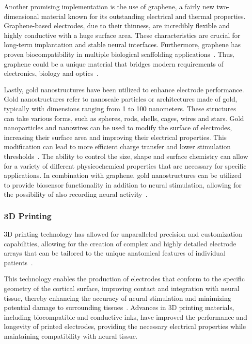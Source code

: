 \documentclass[twocolumn,10pt]{article}
\begin{document}
Another promising implementation is the use of graphene, a fairly new
two-dimensional material known for its outstanding electrical and thermal
properties. Graphene-based electrodes, due to their thinness, are incredibly
flexible and highly conductive with a huge surface area. These characteristics
are crucial for long-term implantation and stable neural interfaces.
Furthermore, graphene has proven biocompatibility in multiple biological
scaffolding
applications~\parencite{liThreedimensionalGrapheneFoam2013,sahniBiocompatibilityPristineGraphene2013}.
Thus, graphene could be a unique material that bridges modern requirements of
electronics, biology and
optics~\parencite{luGraphenebasedNeurotechnologiesAdvanced2018}.

Lastly, gold nanostructures have been utilized to enhance electrode performance.
Gold nanostructures refer to nanoscale particles or architectures made of gold,
typically with dimensions ranging from 1 to 100 nanometers. These structures can
take various forms, such as spheres, rods, shells, cages, wires and stars. Gold
nanoparticles and nanowires can be used to modify the surface of electrodes,
increasing their surface area and improving their electrical properties. This
modification can lead to more efficient charge transfer and lower stimulation
thresholds~\parencite{zareGoldNanostructuresSynthesis2022}. The ability to
control the size, shape and surface chemistry can allow for a variety of
different physicochemical properties that are necessary for specific
applications. In combination with graphene, gold nanostructures can be utilized
to provide biosensor functionality in addition to neural stimulation, allowing
for the possibility of also recording neural
activity~\parencite{raufGoldNanostructuredLaserscribed2021}.

\subsubsection*{3D Printing}
3D printing technology has allowed for unparalleled precision and
customization capabilities, allowing for the creation of complex and highly
detailed electrode arrays that can be tailored to the unique anatomical features
of individual patients~\parencite{guoImplantableLiquidMetalbased2017}.

This technology enables the production of electrodes that conform to the
specific geometry of the cortical surface, improving contact and integration
with neural tissue, thereby enhancing the accuracy of neural stimulation and
minimizing potential damage to surrounding
tissues~\parencite{liuSoftElasticHydrogelbased2019}. Advances in 3D printing
materials, including biocompatible and conductive inks, have improved the
performance and longevity of printed electrodes, providing the necessary
electrical properties while maintaining compatibility with neural tissue.
\end{document}
